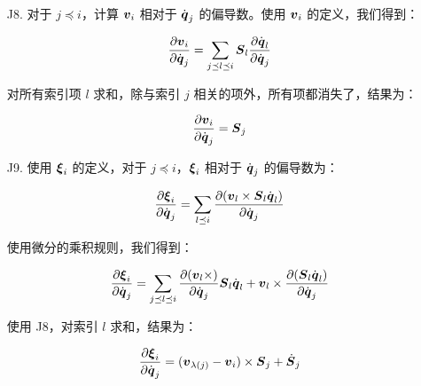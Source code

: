 \documentclass[letterpaper, 10 pt, conference]{ieeetran}  %
\begin{document}
{\begin{enumerate}
使用 $\gammabar_{l}$ 的定义，方程(\ref{dgamma_eq4})变为： 

\begin{equation}
    \frac{\partial \gammabar_{i}}{\partial \q_{j}} = (\gammabar_{\lambda(j)} - \gammabar_{i})  \times \Phibar_{j}
\label{dgamma_eq5}
\end{equation}

\item[J8.] 对于 $j \preceq i$，计算 $\boldsymbol{v}_{i}$ 相对于 $\dot{\boldsymbol{q}}_{j}$ 的偏导数。使用 $\boldsymbol{v}_{i}$ 的定义，我们得到：



\begin{equation}
    \frac{\partial \v_{i}}{\partial \dot{\q}_{j}} = \sum_{j \preceq l \preceq i} \Phibar_{l} \frac{\partial  \qd_{l} }{\partial \dot{\q}_{j}} 
    \label{dv_dqdot_eq1}
\end{equation}

对所有索引项 $l$ 求和，除与索引 $j$ 相关的项外，所有项都消失了，结果为：

\begin{equation}
    \frac{\partial \v_{i}}{\partial \dot{\q}_{j}} = \Phibar_{j}
    \label{dv_dqdot_eq2}
\end{equation}

\item[J9.] 使用 $\boldsymbol{\xi}_{i}$ 的定义，对于 $j \preceq i$，$\boldsymbol{\xi}_{i}$ 相对于 $\dot{\boldsymbol{q}}_{j}$ 的偏导数为：



\begin{equation}
    \frac{\partial \xibar_{i}}{\partial \dot{\q}_{j}} = \sum_{l \preceq i} \frac{\partial (\v_{l} \times \Phibar_{l} \dot{\q}_{l})}{\partial \dot{\q}_{j}}  
    \label{dxi_qdot_eq1}
\end{equation}

使用微分的乘积规则，我们得到：

\begin{equation}
    \frac{\partial \xibar_{i}}{\partial \dot{\q}_{j}} = \sum_{j \preceq l \preceq i} \frac{\partial (\v_{l} \times )}{\partial \dot{\q}_{j}}  \Phibar_{l} \dot{\q}_{l} + \v_{l} \times \frac{\partial (\Phibar_{l} \dot{\q}_{l} )}{\partial \dot{\q}_{j}}  
    \label{dxi_qdot_eq2}
\end{equation}

使用 J8，对索引 $l$ 求和，结果为：

\begin{equation}
    \frac{\partial \xibar_{i}}{\partial \dot{\q}_{j}} =  (\v_{\lambda(j)} - \v_{i})  \times \Phibar_{j} + \Phibardot_{j}
    \label{dxi_qdot_eq3}
\end{equation}


\end{enumerate}}
\end{document}
